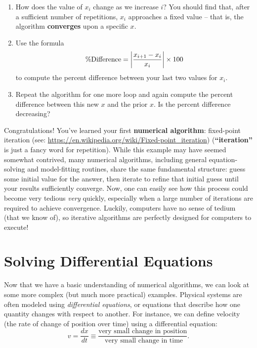 \documentclass[11pt]{article}
\begin{document}
\medskip
\begin{enumerate}[resume]
    \item How does the value of $x_i$ change as we increase $i$? You should find that, after a sufficient number of repetitions, $x_i$ approaches a fixed value -- that is, the algorithm \textbf{converges} upon a specific $x$.
    \item Use the formula 
    \begin{equation} \label{eq:percent}
        \% {\rm Difference} = \left| \frac{x_{i+1} - x_i}{x_i} \right| \times 100
    \end{equation}
    to compute the percent difference between your last two values for $x_i$.
    \item Repeat the algorithm for one more loop and again compute the percent difference between this new $x$ and the prior $x$. Is the percent difference decreasing?
\end{enumerate}

\noindent
Congratulations! You've learned your first \textbf{numerical algorithm}: fixed-point iteration (see: \url{https://en.wikipedia.org/wiki/Fixed-point_iteration}) (\textbf{``iteration''} is just a fancy word for repetition). While this example may have seemed somewhat contrived, many numerical algorithms, including general equation-solving and model-fitting routines, share the same fundamental structure: guess some initial value for the answer, then iterate to refine that initial guess until your results sufficiently converge. Now, one can easily see how this process could become very tedious \textit{very} quickly, especially when a large number of iterations are required to achieve convergence. Luckily, computers have no sense of tedium (that we know of), so iterative algorithms are perfectly designed for computers to execute! 

\section{Solving Differential Equations}
Now that we have a basic understanding of numerical algorithms, we can look at some more complex (but much more practical) examples. Physical systems are often modeled using \textit{differential equations}, or equations that describe how one quantity changes with respect to another. For instance, we can define velocity (the rate of change of position over time) using a differential equation:
\begin{equation} \label{eq:vel}
    v = \frac{dx}{dt} \equiv \frac{\text{very small change in position}}{\text{ very small change in time}}.
\end{equation}
\end{document}
